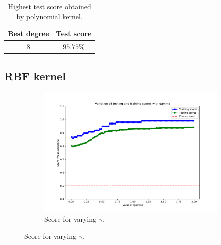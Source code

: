 \documentclass{article}
\begin{document}
\begin{table}[!ht]
\centering
\begin{tabular}{|c|c|} \hline
Best degree & Test score \\ \hline
$8$ & $95.75\%$\\ \hline
\end{tabular}
\caption{Highest test score obtained by polynomial kernel.}
\label{2_best_poly}
\end{table}

\subsection{RBF kernel}

\begin{figure}[!ht]
\centering
\begin{subfigure}{0.8\textwidth}
\centering
\includegraphics[width=\textwidth]{./Figures/2c_score_rbf}
\caption{Score for varying $\gamma$.}
\label{2_score_rbf}
\end{subfigure}


\end{figure}
\end{document}
